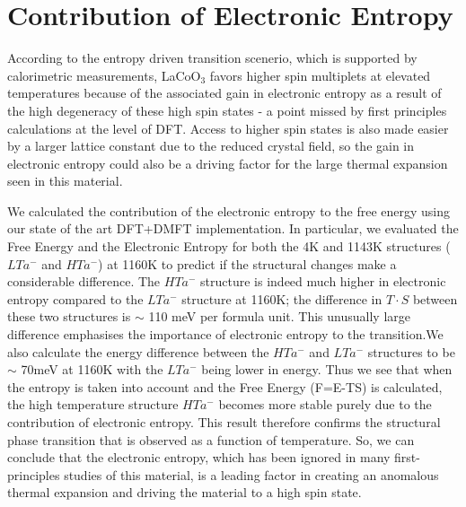 \documentclass[10pt]{ruthesis}
\begin{document}
{\section{Contribution of Electronic Entropy} 
According to the entropy driven transition scenerio, which is supported by calorimetric measurements\cite{Stolen}, LaCoO$_3$ favors higher spin multiplets  at elevated temperatures because of the  associated gain in electronic entropy as a result of the high degeneracy of these high spin states - a point missed by first principles calculations at the level of DFT. Access to higher spin states is also made easier by a larger lattice constant due to the reduced crystal field, so the gain in electronic entropy could also be a driving factor for the large thermal expansion seen in this material.

We calculated the contribution of the electronic entropy to the free energy using our state of the art DFT+DMFT implementation\cite{Birol}. 
In particular, we evaluated the Free Energy and the Electronic Entropy for both the 4K and 1143K structures ($LTa^-$ and $HTa^-$) at 1160K to predict if the structural changes make a considerable difference. 
%
The $HTa^-$ structure is indeed much higher in electronic entropy compared to the $LTa^-$ structure at 1160K; the difference in $T\cdot S$ between these two structures is $\sim$ 110 meV per formula unit. This unusually large difference emphasises the importance of electronic entropy to the transition.We also calculate the energy difference between the $HTa^-$ and $LTa^-$ structures to be $\sim$ 70meV at 1160K with the $LTa^-$ being lower in energy. Thus we see that when the entropy is taken into account and the Free Energy (F=E-TS) is calculated, the high temperature structure $HTa^-$ becomes more stable purely due to the contribution of electronic entropy.  This result therefore confirms the structural phase transition that is observed as a function of temperature. So, we can conclude that the electronic entropy, which has been ignored in many first-principles studies of this material, is a leading factor in creating an anomalous thermal expansion and driving the material to a high spin state. 


}
\end{document}
